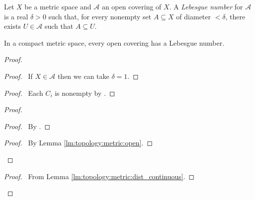 \begin{df}
  Let $X$ be a metric space and $\mathcal{A}$ an open covering of $X$. A
  \emph{Lebesgue number} for $\mathcal{A}$ is a real $\delta > 0$ such that,
  for every nonempty set $A \subseteq X$ of diameter $< \delta$, there exists
  $U \in \mathcal{A}$ such that $A \subseteq U$.
\end{df}

\begin{lm}
  In a compact metric space, every open covering has a Lebesgue number.
\end{lm}

\begin{proof}
  \pf
  \begin{proof}
    \pf\ If $X \in \mathcal{A}$ then we can take $\delta = 1$.
  \end{proof}
  \begin{proof}
    \pf\ Each $C_i$ is nonempty by .
  \end{proof}
  \begin{proof}
    \begin{proof}
      \pf\ By .
    \end{proof}
    \begin{proof}
      \pf\ By Lemma \ref{lm:topology:metric:open}.
    \end{proof}
  \end{proof}
  \begin{proof}
    \pf\ From Lemma \ref{lm:topology:metric:dist_continuous}.
  \end{proof}
\end{proof}
